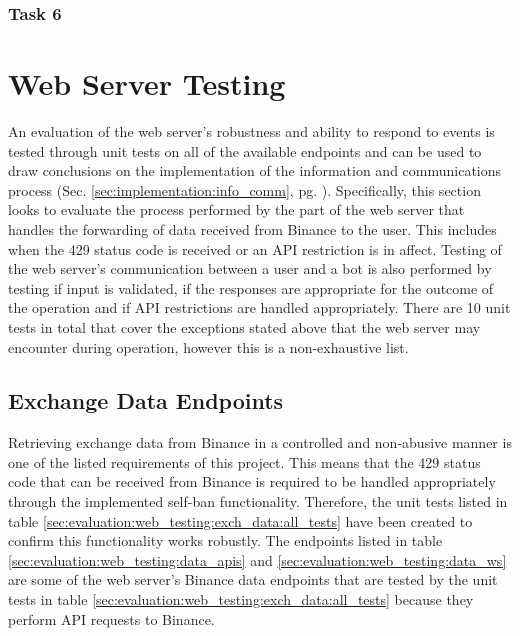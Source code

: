 

\subsubsection{Task 6}
\label{sec:evaluation:ui:tasks:q6}
\section{Web Server Testing}
\label{sec:evaluation:web_server}

\noindent An evaluation of the web server's robustness and ability to respond to events is tested through unit tests on all of the available endpoints and can be used to draw conclusions on the implementation of the information and communications process (Sec. \ref{sec:implementation:info_comm}, pg. \pageref{sec:implementation:info_comm}). Specifically, this section looks to evaluate the process performed by the part of the web server that handles the forwarding of data received from Binance to the user. This includes when the 429 status code is received or an API restriction is in affect. Testing of the web server's communication between a user and a bot is also performed by testing if input is validated, if the responses are appropriate for the outcome of the operation and if API restrictions are handled appropriately. There are 10 unit tests in total that cover the exceptions stated above that the web server may encounter during operation, however this is a non-exhaustive list.


\subsection{Exchange Data Endpoints}
\label{sec:evaluation:web_server:exch_data}

\noindent Retrieving exchange data from Binance in a controlled and non-abusive manner is one of the listed requirements of this project. This means that the 429 status code that can be received from Binance is required to be handled appropriately through the implemented self-ban functionality. Therefore, the unit tests listed in table \ref{sec:evaluation:web_testing:exch_data:all_tests} have been created to confirm this functionality works robustly. The endpoints listed in table \ref{sec:evaluation:web_testing:data_apis} and \ref{sec:evaluation:web_testing:data_ws} are some of the web server's Binance data endpoints that are tested by the unit tests in table \ref{sec:evaluation:web_testing:exch_data:all_tests} because they perform API requests to Binance. 


